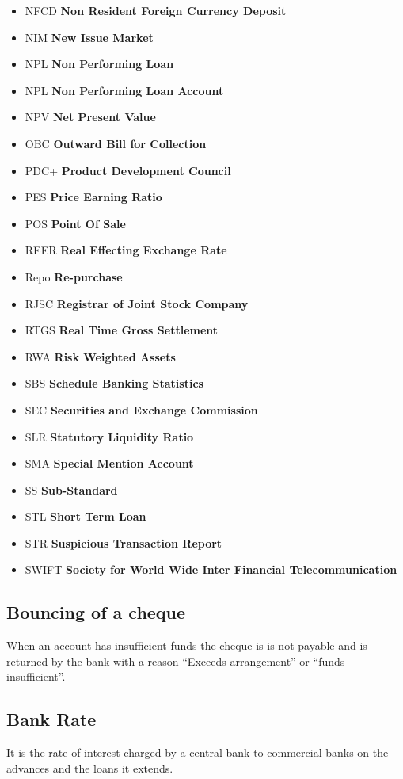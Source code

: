 \documentclass[11pt]{article}
\begin{document}
\begin{itemize}
\item NFCD \textbf{Non Resident Foreign Currency Deposit}
\item NIM \textbf{New Issue Market}
\item NPL  \textbf{Non Performing Loan}
\item NPL  \textbf{Non Performing Loan Account}
\item NPV  \textbf{Net Present Value}
\item OBC  \textbf{Outward Bill for Collection}
\item PDC+  \textbf{Product Development Council}
\item PES  \textbf{Price Earning Ratio}
\item POS  \textbf{Point Of Sale}
\item REER \textbf{Real Effecting Exchange Rate}
\item Repo \textbf{Re-purchase}
\item RJSC  \textbf{Registrar of Joint Stock Company}
\item RTGS \textbf{Real Time Gross Settlement}
\item RWA \textbf{Risk Weighted Assets}
\item SBS \textbf{Schedule Banking Statistics}
\item SEC \textbf{Securities and Exchange Commission}
\item SLR \textbf{Statutory Liquidity Ratio}
\item SMA \textbf{Special Mention Account}
\item SS  \textbf{Sub-Standard}
\item STL \textbf{Short Term Loan}
\item STR \textbf{Suspicious Transaction Report}
\item SWIFT \textbf{Society for World Wide Inter Financial Telecommunication}
\end{itemize}

\subsection{Bouncing of a cheque}
\label{sec:org772af0e}
When an account has insufficient funds the cheque is is not payable
and is returned by the bank with a reason “Exceeds arrangement” or
“funds insufficient”.
\subsection{Bank Rate}
\label{sec:orge64d517}
It is the rate of interest charged by a central bank to commercial
banks on the advances and the loans it extends.
\end{document}
